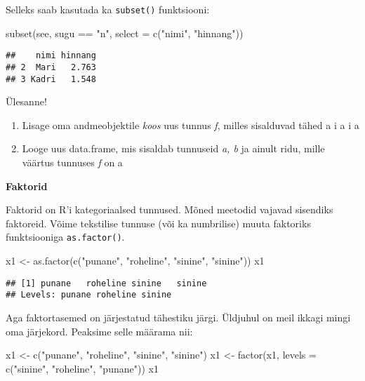 \documentclass[
]{book}
\newenvironment{Shaded}{\begin{snugshade}}{\end{snugshade}}
\newcommand{\AttributeTok}[1]{\textcolor[rgb]{0.77,0.63,0.00}{#1}}
\newcommand{\FunctionTok}[1]{\textcolor[rgb]{0.00,0.00,0.00}{#1}}
\newcommand{\NormalTok}[1]{#1}
\newcommand{\OtherTok}[1]{\textcolor[rgb]{0.56,0.35,0.01}{#1}}
\newcommand{\SpecialCharTok}[1]{\textcolor[rgb]{0.00,0.00,0.00}{#1}}
\newcommand{\StringTok}[1]{\textcolor[rgb]{0.31,0.60,0.02}{#1}}
\providecommand{\tightlist}{%
  \setlength{\itemsep}{0pt}\setlength{\parskip}{0pt}}
\begin{document}
Selleks saab kasutada ka \texttt{subset()} funktsiooni:

\begin{Shaded}
\begin{Highlighting}[]
\FunctionTok{subset}\NormalTok{(see, sugu }\SpecialCharTok{==} \StringTok{"n"}\NormalTok{, }\AttributeTok{select =} \FunctionTok{c}\NormalTok{(}\StringTok{"nimi"}\NormalTok{, }\StringTok{"hinnang"}\NormalTok{))}
\end{Highlighting}
\end{Shaded}

\begin{verbatim}
##    nimi hinnang
## 2  Mari   2.763
## 3 Kadri   1.548
\end{verbatim}

Ülesanne!

\begin{enumerate}
\def\labelenumi{\arabic{enumi}.}
\tightlist
\item
  Lisage oma andmeobjektile \emph{koos} uus tunnus \emph{f}, milles sisalduvad tähed a i a i a
\item
  Looge uus data.frame, mis sisaldab tunnuseid \emph{a, b} ja ainult ridu, mille väärtus tunnuses \emph{f} on a
\end{enumerate}

\textbf{Faktorid}

Faktorid on R'i kategoriaalsed tunnused. Mõned meetodid vajavad sisendiks faktoreid. Võime tekstilise tunnuse (või ka numbrilise) muuta faktoriks funktsiooniga \texttt{as.factor()}.

\begin{Shaded}
\begin{Highlighting}[]
\NormalTok{x1 }\OtherTok{\textless{}{-}} \FunctionTok{as.factor}\NormalTok{(}\FunctionTok{c}\NormalTok{(}\StringTok{"punane"}\NormalTok{, }\StringTok{"roheline"}\NormalTok{, }\StringTok{"sinine"}\NormalTok{, }\StringTok{"sinine"}\NormalTok{))}
\NormalTok{x1}
\end{Highlighting}
\end{Shaded}

\begin{verbatim}
## [1] punane   roheline sinine   sinine  
## Levels: punane roheline sinine
\end{verbatim}

Aga faktortasemed on järjestatud tähestiku järgi. Üldjuhul on meil ikkagi mingi oma järjekord. Peaksime selle määrama nii:

\begin{Shaded}
\begin{Highlighting}[]
\NormalTok{x1 }\OtherTok{\textless{}{-}} \FunctionTok{c}\NormalTok{(}\StringTok{"punane"}\NormalTok{, }\StringTok{"roheline"}\NormalTok{, }\StringTok{"sinine"}\NormalTok{, }\StringTok{"sinine"}\NormalTok{)}
\NormalTok{x1 }\OtherTok{\textless{}{-}} \FunctionTok{factor}\NormalTok{(x1, }\AttributeTok{levels =} \FunctionTok{c}\NormalTok{(}\StringTok{"sinine"}\NormalTok{, }\StringTok{"roheline"}\NormalTok{, }\StringTok{"punane"}\NormalTok{))}
\NormalTok{x1}
\end{Highlighting}
\end{Shaded}
\end{document}
